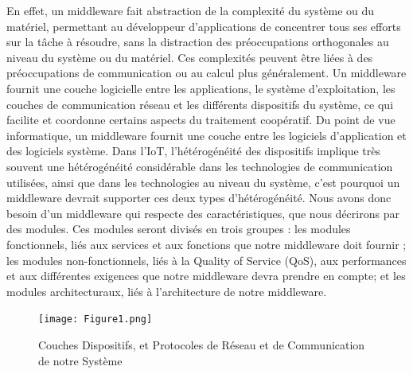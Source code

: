 En effet, un middleware fait abstraction de la complexité du système ou du matériel, permettant au développeur d'applications de concentrer tous ses efforts sur la tâche à résoudre, sans la distraction des préoccupations orthogonales au niveau du système ou du matériel. Ces complexités peuvent être liées à des préoccupations de communication ou au calcul plus généralement. Un middleware fournit une couche logicielle entre les applications, le système d'exploitation, les couches de communication réseau et les différents dispositifs du système, ce qui facilite et coordonne certains aspects du traitement coopératif. Du point de vue informatique, un middleware fournit une couche entre les logiciels d'application et des logiciels système. Dans l'IoT, l’hétérogénéité des dispositifs implique très souvent une hétérogénéité considérable dans les technologies de communication utilisées, ainsi que dans les technologies au niveau du système, c’est pourquoi un middleware devrait supporter ces deux types d’hétérogénéité\cite{li2015iot}. Nous avons donc besoin d’un middleware qui respecte des caractéristiques, que nous décrirons par des modules. Ces modules seront divisés en trois groupes : les modules fonctionnels, liés aux services et aux fonctions que notre middleware doit fournir ; les modules non-fonctionnels, liés à la Quality of Service (QoS), aux performances et aux différentes exigences que notre middleware devra prendre en compte; et les modules architecturaux, liés à l’architecture de notre middleware.
\\
\begin{figure}[h!]
	\hspace*{-1cm}
	\centering
	\texttt{[image: Figure1.png]}
	\caption{Couches Dispositifs, et Protocoles de Réseau et de Communication de notre Système}
	\label{fig:couches}
\end{figure}

